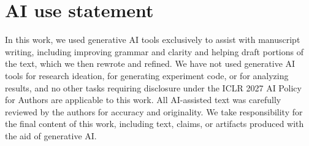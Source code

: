 \section*{AI use statement}

In this work, we used generative AI tools exclusively to assist with manuscript writing, including improving grammar and clarity and helping draft portions of the text, which we then rewrote and refined. We have not used generative AI tools for research ideation, for generating experiment code, or for analyzing results, and no other tasks requiring disclosure under the ICLR 2027 AI Policy for Authors are applicable to this work. All AI-assisted text was carefully reviewed by the authors for accuracy and originality. We take responsibility for the final content of this work, including text, claims, or artifacts produced with the aid of generative AI.

